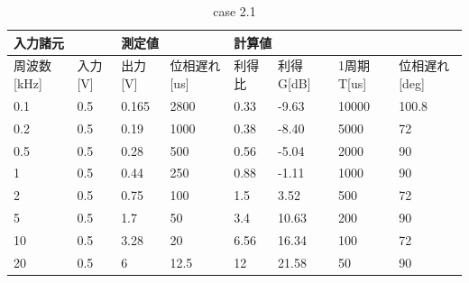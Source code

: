 \documentclass[dvipdfmx,titlepage,a4j]{jsarticle}  %
\begin{document}
\begin{table}[H]
  \centering
  \caption{case 2.1}
  \begin{tabular}{ll|ll|llll}
  \hline
  \multicolumn{2}{l|}{入力諸元}                        & \multicolumn{2}{l|}{測定値}                           & \multicolumn{4}{l}{計算値}                                                                                                                          \\ \hline
  \multicolumn{1}{l|}{周波数{[}kHz{]}} & 入力{[}V{]} & \multicolumn{1}{l|}{出力{[}V{]}} & 位相遅れ{[}us{]} & \multicolumn{1}{l|}{利得比} & \multicolumn{1}{l|}{利得G{[}dB{]}} & \multicolumn{1}{l|}{1周期T{[}us{]}} & \multicolumn{1}{l}{位相遅れ{[}deg{]}} \\ \hline \hline
  \multicolumn{1}{l|}{0.1}           & 0.5         & \multicolumn{1}{l|}{0.165}       & 2800            & \multicolumn{1}{l|}{0.33}    & \multicolumn{1}{l|}{-9.63}           & \multicolumn{1}{l|}{10000}           & 100.8                               \\ \hline
  \multicolumn{1}{l|}{0.2}           & 0.5         & \multicolumn{1}{l|}{0.19}        & 1000            & \multicolumn{1}{l|}{0.38}    & \multicolumn{1}{l|}{-8.40}           & \multicolumn{1}{l|}{5000}            & 72                                  \\ \hline
  \multicolumn{1}{l|}{0.5}           & 0.5         & \multicolumn{1}{l|}{0.28}        & 500             & \multicolumn{1}{l|}{0.56}    & \multicolumn{1}{l|}{-5.04}           & \multicolumn{1}{l|}{2000}            & 90                                  \\ \hline
  \multicolumn{1}{l|}{1}             & 0.5         & \multicolumn{1}{l|}{0.44}        & 250             & \multicolumn{1}{l|}{0.88}    & \multicolumn{1}{l|}{-1.11}           & \multicolumn{1}{l|}{1000}            & 90                                  \\ \hline
  \multicolumn{1}{l|}{2}             & 0.5         & \multicolumn{1}{l|}{0.75}        & 100             & \multicolumn{1}{l|}{1.5}     & \multicolumn{1}{l|}{3.52}            & \multicolumn{1}{l|}{500}             & 72                                  \\ \hline
  \multicolumn{1}{l|}{5}             & 0.5         & \multicolumn{1}{l|}{1.7}         & 50              & \multicolumn{1}{l|}{3.4}     & \multicolumn{1}{l|}{10.63}           & \multicolumn{1}{l|}{200}             & 90                                  \\ \hline
  \multicolumn{1}{l|}{10}            & 0.5         & \multicolumn{1}{l|}{3.28}        & 20              & \multicolumn{1}{l|}{6.56}    & \multicolumn{1}{l|}{16.34}           & \multicolumn{1}{l|}{100}             & 72                                  \\ \hline
  \multicolumn{1}{l|}{20}            & 0.5         & \multicolumn{1}{l|}{6}           & 12.5            & \multicolumn{1}{l|}{12}      & \multicolumn{1}{l|}{21.58}           & \multicolumn{1}{l|}{50}              & 90                                  \\ \hline
  \end{tabular}
\end{table}
\end{document}
